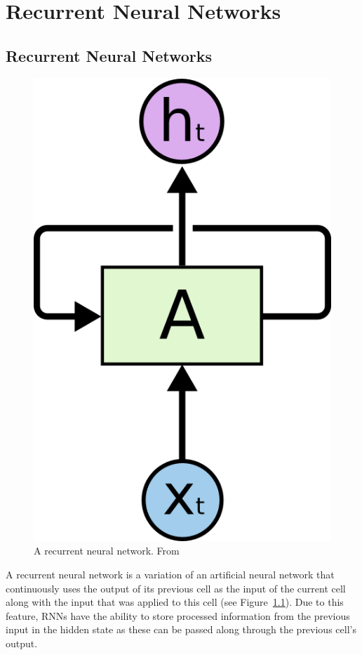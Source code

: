 \chapter{Recurrent Neural Networks}\label{ch:rnn}

\section{Recurrent Neural Networks}
\begin{figure}
	\begin{center}
		\includegraphics[scale=0.5]{rnn/rnn_rolled}
	\end{center}
	\caption{A recurrent neural network. From~\cite{olah2015understanding}\label{fig:rnn_img}}
\end{figure}

A recurrent neural network is a variation of an artificial neural network that continuously uses the output of its previous cell as the input of the current cell along with the input that was applied to this cell (see Figure~\ref{fig:rnn_img}). Due to this feature, RNNs have the ability to store processed information from the previous input in the hidden state as these can be passed along through the previous cell's output. 

